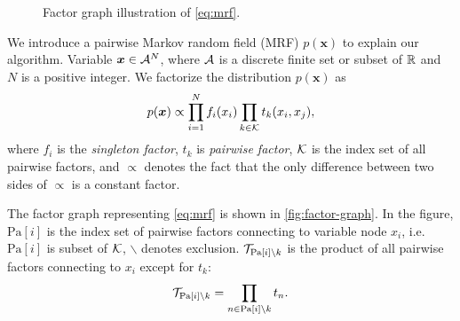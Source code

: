 \documentclass[conference]{IEEEtran}
\begin{document}
\begin{figure}
  \begin{centering}
    \caption{Factor graph illustration of \autoref{eq:mrf}.}\label{fig:factor-graph}
    \vspace{0.1cm}
  \end{centering}
\end{figure}
We introduce a pairwise Markov random field (MRF) $p(\bm{x})$ to explain our algorithm. Variable $\bm{x} \in \mathcal{A}^N$, where $\mathcal{A}$ is a discrete finite set or subset of $\mathbb{R}$ and $N$ is a positive integer. We factorize the distribution $p(\bm{x})$ as
\begin{equation}\label{eq:mrf}
  p(\bm{x}) \propto \prod_{{i=1}}^{N} f_i(x_i) \prod_{k \in \mathcal{K}} t_k(x_i, x_j),
\end{equation}
where $f_i$ is the \textit{singleton factor}, $t_k$ is \textit{pairwise factor}, $\mathcal{K}$ is the index set of all pairwise factors, and $\propto$ denotes the fact that the only difference between two sides of $\propto$ is a constant factor.

The factor graph representing \autoref{eq:mrf} is shown in \autoref{fig:factor-graph}. In the figure, $\text{Pa}[i]$ is the index set of pairwise factors connecting to variable node $x_i$, i.e. $\text{Pa}[i]$ is subset of $\mathcal{K}$, $\backslash$ denotes exclusion. $\mathcal{T}_{\text{Pa}[i]\backslash k}$ is the product of all pairwise factors connecting to $x_i$ except for $t_k$:
\begin{equation}
  \mathcal{T}_{\text{Pa}[i]\backslash k} = \prod_{n \in \text{Pa}[i]\backslash k}t_n.
\end{equation}
\end{document}
